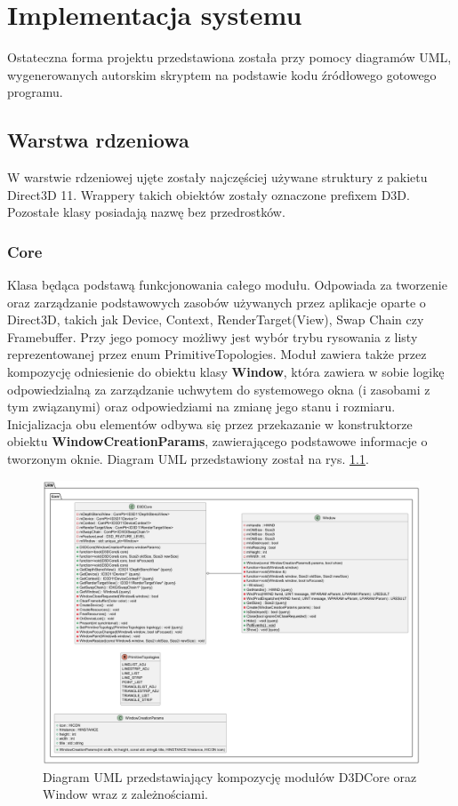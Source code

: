 \chapter{Implementacja systemu}
	Ostateczna forma projektu przedstawiona została przy pomocy diagramów UML, wygenerowanych autorskim skryptem na podstawie kodu źródłowego gotowego programu.

\section{Warstwa rdzeniowa}
	W warstwie rdzeniowej ujęte zostały najczęściej używane struktury z pakietu Direct3D 11. Wrappery takich obiektów zostały oznaczone prefixem D3D. Pozostałe klasy posiadają nazwę bez przedrostków.

\subsection{Core}
	Klasa będąca podstawą funkcjonowania całego modułu. 
	Odpowiada za tworzenie oraz zarządzanie podstawowych zasobów używanych przez aplikacje oparte o Direct3D, takich jak Device, Context, RenderTarget(View), Swap Chain czy Framebuffer. Przy jego pomocy możliwy jest wybór trybu rysowania z listy reprezentowanej przez enum PrimitiveTopologies.
	Moduł zawiera także przez kompozycję odniesienie do obiektu klasy \textbf{Window}, która zawiera w sobie logikę odpowiedzialną za zarządzanie uchwytem do systemowego okna (i zasobami z tym związanymi) oraz odpowiedziami na zmianę jego stanu i rozmiaru.
	Inicjalizacja obu elementów odbywa się przez przekazanie w konstruktorze obiektu \textbf{WindowCreationParams}, zawierającego podstawowe informacje o tworzonym oknie.
	Diagram UML przedstawiony został na rys. \ref{UML_D3DCore}.
	
	
	\begin{figure}[ht!]
		\centering
		\includegraphics[width=\textwidth]{images/UML/core.png}
		\caption{Diagram UML przedstawiający kompozycję modułów D3DCore oraz Window wraz z zależnościami.}
		\label{UML_D3DCore}
	\end{figure}
	
